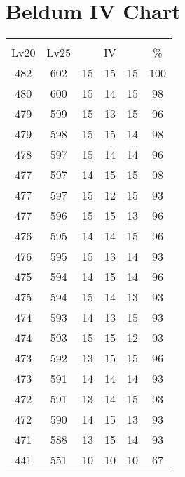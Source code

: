 \documentclass{article}%
\begin{document}
%
\normalsize%
\section{Beldum IV Chart}%
\label{sec:Beldum IV Chart}%
\renewcommand{\arraystretch}{1.5}%
\begin{tabular}{|c|c|c|c|c|c|}%
\hline%
\multicolumn{6}{|c|}{\textcolor{white}{ 
\linebreak{Beldum}
}%
\cellcolor{black}}\\%
\multicolumn{1}{|c}{Lv20}&\multicolumn{1}{c|}{Lv25}&\multicolumn{3}{c|}{IV}&\multicolumn{1}{|c|}{\%}\\%
\hline%
\rowcolor{color100}%
482&602&15&15&15&100\\%
\hline%
\rowcolor{color98}%
480&600&15&14&15&98\\%
\hline%
\rowcolor{color96}%
479&599&15&13&15&96\\%
\hline%
\rowcolor{color98}%
479&598&15&15&14&98\\%
\hline%
\rowcolor{color96}%
478&597&15&14&14&96\\%
\hline%
\rowcolor{color98}%
477&597&14&15&15&98\\%
\hline%
\rowcolor{color93}%
477&597&15&12&15&93\\%
\hline%
\rowcolor{color96}%
477&596&15&15&13&96\\%
\hline%
\rowcolor{color96}%
476&595&14&14&15&96\\%
\hline%
\rowcolor{color93}%
476&595&15&13&14&93\\%
\hline%
\rowcolor{color96}%
475&594&14&15&14&96\\%
\hline%
\rowcolor{color93}%
475&594&15&14&13&93\\%
\hline%
\rowcolor{color93}%
474&593&14&13&15&93\\%
\hline%
\rowcolor{color93}%
474&593&15&15&12&93\\%
\hline%
\rowcolor{color96}%
473&592&13&15&15&96\\%
\hline%
\rowcolor{color93}%
473&591&14&14&14&93\\%
\hline%
\rowcolor{color93}%
472&591&13&14&15&93\\%
\hline%
\rowcolor{color93}%
472&590&14&15&13&93\\%
\hline%
\rowcolor{color93}%
471&588&13&15&14&93\\%
\hline%
\rowcolor{color91}%
441&551&10&10&10&67\\%
\end{tabular}

%
\end{document}

